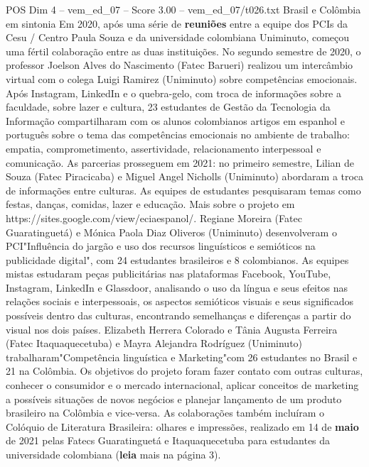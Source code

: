 \begin{textsample}{POS Dim 4 – vem\_ed\_07 – Score 3.00 – vem\_ed\_07/t026.txt}  \label{ex:f4_pos_038}
Brasil e Colômbia em sintonia Em 2020, após uma série de \textbf{reuniões} entre a equipe dos PCIs da Cesu / Centro Paula Souza e da universidade colombiana Uniminuto, começou uma fértil colaboração entre as duas instituições.
No segundo semestre de 2020, o professor Joelson Alves do Nascimento (Fatec Barueri) realizou um intercâmbio virtual com o colega Luigi Ramirez (Uniminuto) sobre competências emocionais.
Após Instagram, LinkedIn e o quebra-gelo, com troca de informações sobre a faculdade, sobre lazer e cultura, 23 estudantes de Gestão da Tecnologia da Informação compartilharam com os alunos colombianos artigos em espanhol e português sobre o tema das competências emocionais no ambiente de trabalho: empatia, comprometimento, assertividade, relacionamento interpessoal e comunicação.
As parcerias prosseguem em 2021: no primeiro semestre, Lilian de Souza (Fatec Piracicaba) e Miguel Angel Nicholls (Uniminuto) abordaram a troca de informações entre culturas.
As equipes de estudantes pesquisaram temas como festas, danças, comidas, lazer e educação.
Mais sobre o projeto em https://sites.google.com/view/eciaespanol/.
Regiane Moreira (Fatec Guaratinguetá) e Mónica Paola Diaz Oliveros (Uniminuto) desenvolveram o PCI"Influência do jargão e uso dos recursos linguísticos e semióticos na publicidade digital", com 24 estudantes brasileiros e 8 colombianos.
As equipes mistas estudaram peças publicitárias nas plataformas Facebook, YouTube, Instagram, LinkedIn e Glassdoor, analisando o uso da língua e seus efeitos nas relações sociais e interpessoais, os aspectos semióticos visuais e seus significados possíveis dentro das culturas, encontrando semelhanças e diferenças a partir do visual nos dois países.
Elizabeth Herrera Colorado e Tânia Augusta Ferreira (Fatec Itaquaquecetuba) e Mayra Alejandra Rodríguez (Uniminuto) trabalharam"Competência linguística e Marketing"com 26 estudantes no Brasil e 21 na Colômbia.
Os objetivos do projeto foram fazer contato com outras culturas, conhecer o consumidor e o mercado internacional, aplicar conceitos de marketing a possíveis situações de novos negócios e planejar lançamento de um produto brasileiro na Colômbia e vice-versa.
As colaborações também incluíram o Colóquio de Literatura Brasileira: olhares e impressões, realizado em 14 de \textbf{maio} de 2021 pelas Fatecs Guaratinguetá e Itaquaquecetuba para estudantes da universidade colombiana (\textbf{leia} mais na página 3).

\end{textsample}
